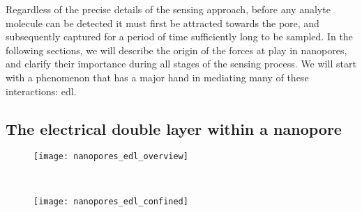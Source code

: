 Regardless of the precise details of the sensing approach, before any analyte molecule can be detected it must
first be attracted towards the pore, and subsequently captured for a period of time sufficiently long to be
sampled. In the following sections, we will describe the origin of the forces at play in nanopores, and
clarify their importance during all stages of the sensing process. We will start with a phenomenon that has a
major hand in mediating many of these interactions: \gls{edl}.


\subsection{The electrical double layer within a nanopore}
%
\label{sec:np:edl}
%

%
\begin{figure*}[ptb]
  \centering

  \begin{subfigure}[t]{115mm}
    \centering
    \caption{}\vspace{-2.5mm}\label{fig:nanopores_edl_overview}
    \texttt{[image: nanopores\_edl\_overview]}
  \end{subfigure}
  \\
  \begin{subfigure}[t]{115mm}
    \centering
    \caption{}\vspace{-2.5mm}\label{fig:nanopores_edl_confined}
    \texttt{[image: nanopores\_edl\_confined]}
  \end{subfigure}

\caption[Schematic overview of the structure of the electrical double layer]{%
  \textbf{Schematic overview of the structure of the electrical double layer (EDL).}
  ()
  When a charged surface is brought into contact with an electrolyte solution, mobile ions of opposite charge
  (\ie~the counterions) will accumulate near the surface, whereas same-charge ions (\ie~the co-ions) will
  deplete. This region of excess charge in the fluid is called the , and has a characteristic
  thickness equal to the Debye length ($\dbl$, see~\cref{eq:nanopores_debye_length}). Counterions in the Stern
  layer are semi-permanently bound to the surface and partially lose their hydration shell. Because the
  surface electrostatic potential drops exponentially inside the electrical double layer, its influence
  becomes negligible after a few Debye lengths, rapidly resulting in an electroneutral bulk ionic
  distribution.
  ()
  Effect of geometrical confinement on the composition of the \gls{edl} within a nanopore at high (left) and
  low (right) ionic strengths. At high salt concentrations, $\dbl$ is short enough to allow the center of the
  pore to remain electroneutral. At low salt concentrations on the other hand, $\dbl$ is the same of larger
  than the radius of the pore, the \glspl{edl} begin to overlap and the center of the pore also contains an
  excess of counterions. Regardless of the salt concentration, the \gls{edl} takes up a significant portion of
  the total pore volume, and hence plays an important role in all nanopore transport phenomena.
  }\label{fig:nanopores_edl}
\end{figure*}
